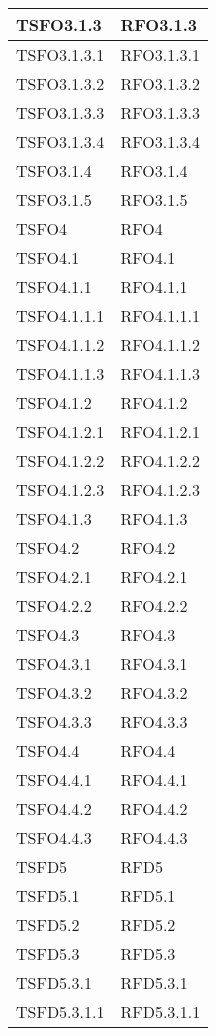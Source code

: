 \begin{center}
\begin{longtable}{ | >{\centering\arraybackslash}m{5cm} | >{\centering\arraybackslash}m{5cm} | }
				TSFO3.1.3 & RFO3.1.3 \\ \hline
				TSFO3.1.3.1 & RFO3.1.3.1 \\ \hline
				TSFO3.1.3.2 & RFO3.1.3.2 \\ \hline
				TSFO3.1.3.3 & RFO3.1.3.3 \\ \hline
				TSFO3.1.3.4 & RFO3.1.3.4 \\ \hline
				TSFO3.1.4 & RFO3.1.4 \\ \hline
				TSFO3.1.5 & RFO3.1.5 \\ \hline
				TSFO4 & RFO4 \\ \hline
				TSFO4.1 & RFO4.1 \\ \hline
				TSFO4.1.1 & RFO4.1.1 \\ \hline
				TSFO4.1.1.1 & RFO4.1.1.1 \\ \hline
				TSFO4.1.1.2 & RFO4.1.1.2 \\ \hline
				TSFO4.1.1.3 & RFO4.1.1.3 \\ \hline
				TSFO4.1.2 & RFO4.1.2 \\ \hline
				TSFO4.1.2.1 & RFO4.1.2.1 \\ \hline
				TSFO4.1.2.2 & RFO4.1.2.2 \\ \hline
				TSFO4.1.2.3 & RFO4.1.2.3 \\ \hline
				TSFO4.1.3 & RFO4.1.3 \\ \hline
				TSFO4.2 & RFO4.2 \\ \hline
				TSFO4.2.1 & RFO4.2.1 \\ \hline
				TSFO4.2.2 & RFO4.2.2 \\ \hline
				TSFO4.3 & RFO4.3 \\ \hline
				TSFO4.3.1 & RFO4.3.1 \\ \hline
				TSFO4.3.2 & RFO4.3.2 \\ \hline
				TSFO4.3.3 & RFO4.3.3 \\ \hline
				TSFO4.4 & RFO4.4 \\ \hline
				TSFO4.4.1 & RFO4.4.1 \\ \hline
				TSFO4.4.2 & RFO4.4.2 \\ \hline
				TSFO4.4.3 & RFO4.4.3 \\ \hline
				TSFD5 & RFD5 \\ \hline
				TSFD5.1 & RFD5.1 \\ \hline
				TSFD5.2 & RFD5.2 \\ \hline
				TSFD5.3 & RFD5.3 \\ \hline
				TSFD5.3.1 & RFD5.3.1 \\ \hline
				TSFD5.3.1.1 & RFD5.3.1.1 \\ \hline

\end{longtable}
\end{center}
